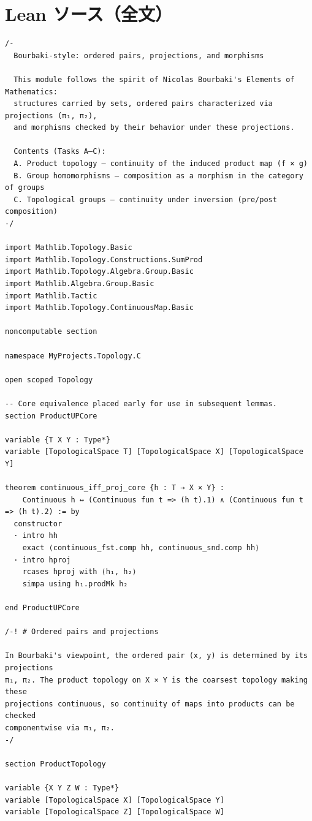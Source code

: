 \documentclass[11pt]{article}
\theoremstyle{definition}
\begin{document}
\section*{Lean ソース（全文）}
\begin{lstlisting}[language=lean]
/-
  Bourbaki-style: ordered pairs, projections, and morphisms

  This module follows the spirit of Nicolas Bourbaki's Elements of Mathematics:
  structures carried by sets, ordered pairs characterized via projections (π₁, π₂),
  and morphisms checked by their behavior under these projections.

  Contents (Tasks A–C):
  A. Product topology — continuity of the induced product map (f × g)
  B. Group homomorphisms — composition as a morphism in the category of groups
  C. Topological groups — continuity under inversion (pre/post composition)
-/

import Mathlib.Topology.Basic
import Mathlib.Topology.Constructions.SumProd
import Mathlib.Topology.Algebra.Group.Basic
import Mathlib.Algebra.Group.Basic
import Mathlib.Tactic
import Mathlib.Topology.ContinuousMap.Basic

noncomputable section

namespace MyProjects.Topology.C

open scoped Topology

-- Core equivalence placed early for use in subsequent lemmas.
section ProductUPCore

variable {T X Y : Type*}
variable [TopologicalSpace T] [TopologicalSpace X] [TopologicalSpace Y]

theorem continuous_iff_proj_core {h : T → X × Y} :
    Continuous h ↔ (Continuous fun t => (h t).1) ∧ (Continuous fun t => (h t).2) := by
  constructor
  · intro hh
    exact ⟨continuous_fst.comp hh, continuous_snd.comp hh⟩
  · intro hproj
    rcases hproj with ⟨h₁, h₂⟩
    simpa using h₁.prodMk h₂

end ProductUPCore

/-! # Ordered pairs and projections

In Bourbaki's viewpoint, the ordered pair (x, y) is determined by its projections
π₁, π₂. The product topology on X × Y is the coarsest topology making these
projections continuous, so continuity of maps into products can be checked
componentwise via π₁, π₂.
-/

section ProductTopology

variable {X Y Z W : Type*}
variable [TopologicalSpace X] [TopologicalSpace Y]
variable [TopologicalSpace Z] [TopologicalSpace W]


\end{lstlisting}
\end{document}
